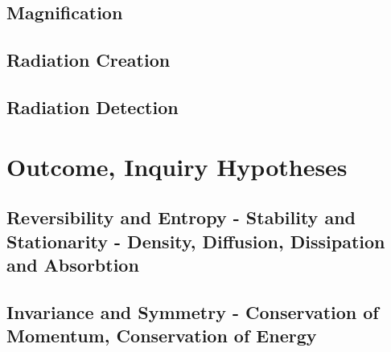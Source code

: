 \subsection{Magnification}
 
\vspace{5ex}
\subsection{Radiation Creation} 

\vspace{5ex}
\subsection{Radiation Detection} 
 
\vspace{5ex}


\section{Outcome, Inquiry Hypotheses}
\subsection{Reversibility and Entropy - Stability and Stationarity - Density, Diffusion, Dissipation and Absorbtion}
 
\vspace{5ex}
\subsection{Invariance and Symmetry - Conservation of Momentum, Conservation of Energy}
 
\vspace{5ex}
